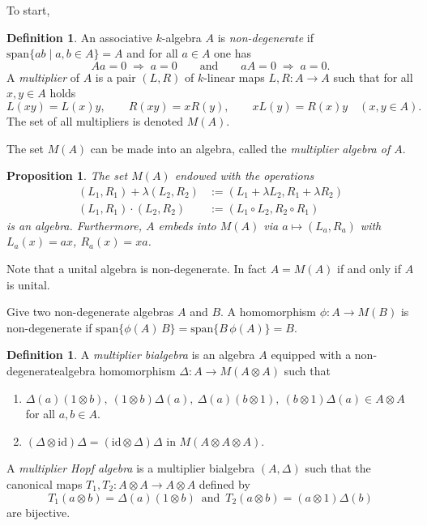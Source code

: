 \documentclass[a4paper,10pt]{amsart}
\newtheorem{proposition}[lemma]{Proposition}
\theoremstyle{definition}
\newtheorem{definition}[lemma]{Definition}
\theoremstyle{remark}
\newcommand{\Span}{\mathrm{span}}
\begin{document}
To start,

\begin{definition}
An associative $k$-algebra $A$ is \emph{non-degenerate} if $\Span \{ab \mid a,b \in A\}=A$ and for all $a \in A$ one has 
$$
Aa=0 \;\Rightarrow\; a=0 \qquad\text{and}\qquad aA=0 \;\Rightarrow\; a=0.
$$
A \emph{multiplier} of $A$ is a pair $(L,R)$ of $k$-linear maps $L,R:A\to A$ such that for all $x,y \in A$ holds
$$
L(xy)=L(x)y,\qquad R(xy)=xR(y),\qquad xL(y)=R(x)y\quad(x,y\in A).
$$
The set of all multipliers is denoted $M(A)$. 
\end{definition}

The set $M(A)$ can be made into an algebra, called the \emph{multiplier algebra of $A$}.

\begin{proposition}
    The set $M(A)$ endowed with the operations
    \begin{align*}
    (L_1,R_1) + \lambda (L_2,R_2) & := (L_1 + \lambda L_2, R_1 + \lambda R_2) \\
    (L_1,R_1)\cdot (L_2,R_2) & := (L_1\circ L_2, R_2 \circ R_1)
    \end{align*}
    is an algebra. Furthermore, $A$ embeds into $M(A)$ via $a\mapsto (L_a,R_a)$ with $L_a(x)=ax$, $R_a(x)=xa$.
\end{proposition}

Note that a unital algebra is non-degenerate. In fact $A = M(A)$ if and only if $A$ is unital.

Give two non-degenerate algebras $A$ and $B$. A homomorphism $\phi: A \rightarrow M(B)$ is non-degenerate if $\Span \{\phi(A)\, B \} = \Span \{B \, \phi(A) \} = B$. 

\begin{definition}
A \emph{multiplier bialgebra} is an algebra $A$ equipped with a non-degeneratealgebra homomorphism $\Delta: A\to M(A\otimes A)$ such that
\begin{enumerate}
\item[(i)] $ \Delta(a)(1\otimes b),\ (1\otimes b)\Delta(a),\ \Delta(a)(b\otimes 1),\ (b\otimes 1)\Delta(a) \in A\otimes A$  for all $a,b\in A$.
\item[(ii)] $(\Delta\otimes \mathrm{id})\Delta = (\mathrm{id}\otimes \Delta)\Delta$  in $M(A\otimes A\otimes A)$.
\end{enumerate}
A \emph{multiplier Hopf algebra} is a multiplier bialgebra $(A,\Delta)$ such that the canonical maps $T_1,T_2: A\otimes A\to A\otimes A$ defined by $$ T_1(a\otimes b)=\Delta(a)(1\otimes b) \, \text{ and } \,  T_2(a\otimes b)=(a\otimes 1)\Delta(b)
$$
are bijective. 
\end{definition}
\end{document}
